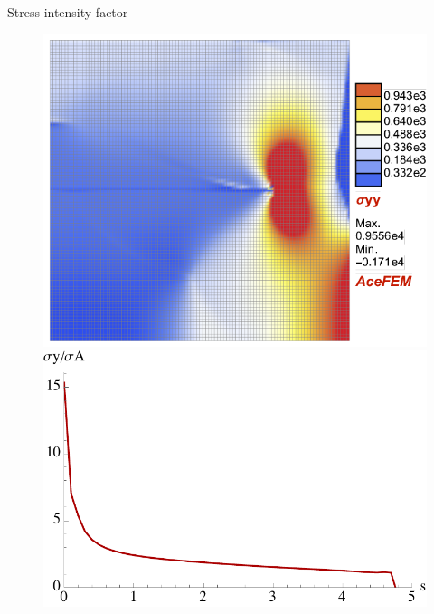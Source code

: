 \documentclass[aspectratio=169,xcolor=dvipsnames]{beamer}
\begin{document}
\begin{frame}{Stress intensity factor}
\begin{figure}
\begin{minipage}{0.35\linewidth}
\begin{minipage}[c]{0.5\linewidth}
		\end{minipage}\hfill
		\begin{minipage}[c]{0.5\linewidth}
				\includegraphics[width=\linewidth]{sigmayy_3L4.pdf}
		\end{minipage}\hfill
		\begin{minipage}[c]{0.5\linewidth}
		\includegraphics[width=\linewidth]{K_L2.pdf}
	\end{minipage}\hfill
	\begin{minipage}[c]{0.5\linewidth}

\end{minipage}
\end{minipage}
\end{figure}
\end{frame}
\end{document}
